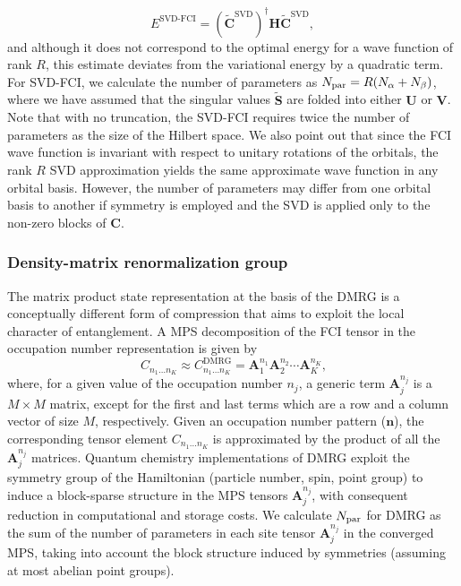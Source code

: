 \documentclass[aip,jcp,amsmath,amssymb, reprint]{revtex4-1}
\begin{document}
\begin{equation}
E^{\text{SVD-FCI}} =(\widetilde{ \mathbf{C} }^{\text{SVD}})^{\dagger} \mathbf{H} \widetilde{ \mathbf{C} }^{\text{SVD}} ,
\end{equation}
and although it does not correspond to the optimal energy for a wave function of rank $R$, this estimate deviates from the variational energy by a quadratic term.
For SVD-FCI, we calculate the number of parameters as $N_{\rm{par}} = R (N_{\alpha} + N_{\beta})$, where we have assumed that the singular values $\widetilde{\mathbf{S}}$ are folded into either $\mathbf{U}$ or $\mathbf{V}$.
Note that with no truncation, the SVD-FCI requires twice the number of parameters as the size of the Hilbert space.
We also point out that since the FCI wave function is invariant with respect to unitary rotations of the orbitals, the rank $R$ SVD approximation yields the same approximate wave function in any orbital basis.
However, the number of parameters may differ from one orbital basis to another if symmetry is employed and the SVD is applied only to the non-zero blocks of $\mathbf{C}$.

\subsubsection{Density-matrix renormalization group}

The matrix product state representation at the basis of the DMRG is a conceptually different form of compression that aims to exploit the local character of entanglement. 
A MPS decomposition of the FCI tensor in the occupation number representation is given by
\begin{equation}
\
C_{n_{1} \ldots n_{K}} \approx C_{n_{1} \ldots n_{K}} ^\mathrm{DMRG}= 
\mathbf{A}^{n_1}_1 \mathbf{A}^{n_2}_2 \cdots \mathbf{A}^{n_K}_K,
\end{equation}
where, for a given value of the occupation number $n_j$, a generic term $\mathbf{A}^{n_j}_j$ is a $M \times M$ matrix, except for the first and last terms which are a row and a column vector of size $M$, respectively.
Given an occupation number pattern ($\mathbf{n}$), the corresponding tensor element $C_{n_{1} \ldots n_{K}}$ is approximated by the product of all the $\mathbf{A}^{n_j}_j$ matrices.
Quantum chemistry implementations of DMRG exploit the symmetry group of the Hamiltonian (particle number, spin, point group) to induce a block-sparse structure in the MPS tensors $\mathbf{A}^{n_j}_j$, with consequent reduction in computational and storage costs.
We calculate $N_{\rm{par}}$ for DMRG as the sum of the number of parameters in each site tensor $\mathbf{A}^{n_j}_j$ in the converged MPS, taking into account the block structure induced by symmetries (assuming at most abelian point groups).
\end{document}
